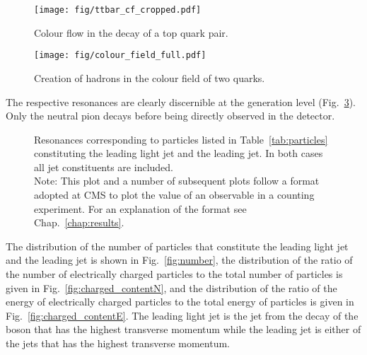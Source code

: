 \begin{figure}[hbtp]

\centering
\texttt{[image: fig/ttbar\_cf\_cropped.pdf]}
\caption{Colour flow in the decay of a top quark pair.}
\label{fig:ttbar_cf}

\end{figure}

\begin{figure}[hbtp]
\centering
\texttt{[image: fig/colour\_field\_full.pdf]}
\caption{Creation of hadrons in the colour field of two quarks.}
\label{fig:colour_field}
\end{figure}

The respective resonances are clearly discernible at the generation level (Fig.~\ref{fig:mass_resonances}). Only the neutral pion decays before being directly observed in the detector.

\begin{figure}[htbp]
\centering
\def\twidth{0.45}
\caption{Resonances corresponding to particles listed in Table~\protect\ref{tab:particles} constituting the leading light jet and the leading \cPqb jet. In both cases all jet constituents are included.\\
 \small Note: This plot and a number of subsequent plots follow a format adopted at CMS to plot the value of an observable in a counting experiment. For an explanation of the format see Chap.~\protect\ref{chap:results}.}
\label{fig:mass_resonances}
\end{figure}

The distribution of the number of particles that constitute the leading light jet and the leading \cPqb jet is shown in Fig.~\ref{fig:number}, the distribution of the ratio of the number of electrically charged particles to the total number of particles is given in Fig.~\ref{fig:charged_contentN}, and the distribution of the ratio of the energy of electrically charged particles to the total energy of particles is given in Fig.~\ref{fig:charged_contentE}. The leading light jet is the jet from the decay of the \PW boson that has the highest transverse momentum \pt while the leading \cPqb jet is either of the \cPqb jets that has the highest transverse momentum.

